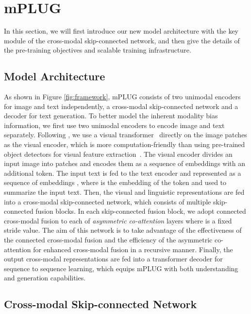 \documentclass[11pt]{article}
\newcommand{\modelname}{mPLUG }
\begin{document}
\section{\modelname}
In this section, we will first introduce our new model architecture with the key module of the cross-modal skip-connected network, and then give the details of the pre-training objectives and scalable training infrastructure. 


\subsection{Model Architecture}

As shown in Figure \ref{fig:framework}, \modelname consists of two unimodal encoders for image and text independently, a cross-modal skip-connected network and a decoder for text generation. To better model the inherent modality bias information, we first use two unimodal encoders to encode image and text separately. Following \cite{dou2021empirical,shen2021much}, we use a visual transformer~\cite{dosovitskiy2020image} directly on the image patches as the visual encoder, which is more computation-friendly than using pre-trained object detectors for visual feature extraction~\cite{anderson2018bottom,zhang2021vinvl}. The visual encoder divides an input image into patches and encodes them as a sequence of embeddings  with an additional  token. The input text is fed to the text encoder and represented as a sequence of embeddings , where  is the embedding of the  token and used to summarize the input text. Then, the visual and linguistic representations are fed into a cross-modal skip-connected network, which consists of multiple skip-connected fusion blocks. In each skip-connected fusion block, we adopt connected cross-modal fusion to each of  \textit{asymmetric co-attention}  layers where  is a fixed stride value. The aim of this network is to take advantage of the effectiveness of the connected cross-modal fusion and the efficiency of the asymmetric co-attention for enhanced cross-modal fusion in a recursive manner. Finally, the output cross-modal representations are fed into a transformer decoder for sequence to sequence learning, which equips \modelname with both understanding and generation capabilities.




\subsection{Cross-modal Skip-connected Network}
\end{document}
